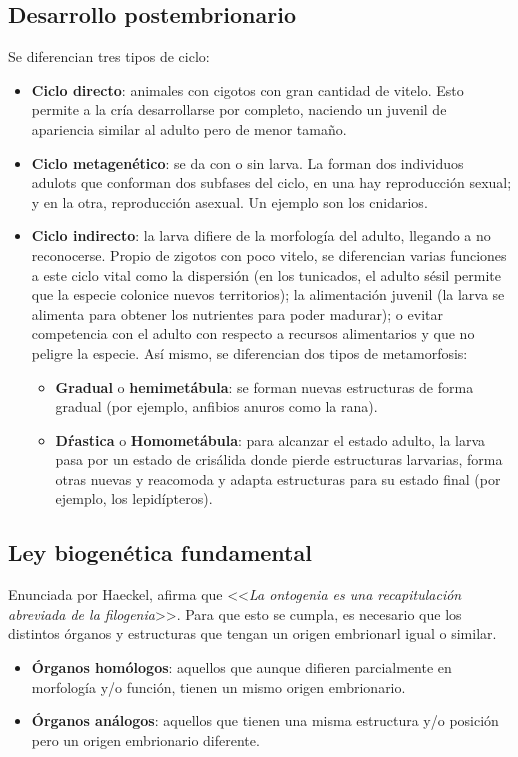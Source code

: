 \subsection{Desarrollo postembrionario}
Se diferencian tres tipos de ciclo:
\begin{itemize}[itemsep=0pt,parsep=0pt,topsep=0pt,partopsep=0pt]
    \item \textbf{Ciclo directo}: animales con cigotos con gran cantidad de vitelo. Esto permite a la cría desarrollarse por completo, naciendo un juvenil de apariencia similar al adulto pero de menor tamaño.
    \item\textbf{Ciclo metagenético}: se da con o sin larva. La forman dos individuos adulots que conforman dos subfases del ciclo, en una hay reproducción sexual; y en la otra, reproducción asexual. Un ejemplo son los cnidarios.
    \item\textbf{Ciclo indirecto}: la larva difiere de la morfología del adulto, llegando a no reconocerse. Propio de zigotos con poco vitelo, se diferencian varias funciones a este ciclo vital como la dispersión (en los tunicados, el adulto sésil permite que la especie colonice nuevos territorios); la alimentación juvenil (la larva se alimenta para obtener los nutrientes para poder madurar); o evitar competencia con el adulto con respecto a recursos alimentarios y que no peligre la especie. Así mismo, se diferencian dos tipos de metamorfosis:
    \begin{itemize}[itemsep=0pt,parsep=0pt,topsep=0pt,partopsep=0pt]
        \item \textbf{Gradual} o \textbf{hemimetábula}: se forman nuevas estructuras de forma gradual (por ejemplo, anfibios anuros como la rana).
        \item\textbf{Dŕastica} o \textbf{Homometábula}: para alcanzar el estado adulto, la larva pasa por un estado de crisálida donde pierde estructuras larvarias, forma otras nuevas y reacomoda y adapta estructuras para su estado final (por ejemplo, los lepidípteros).
    \end{itemize}
\end{itemize}
\subsection{Ley biogenética fundamental}
Enunciada por Haeckel, afirma que <<\textit{La ontogenia es una recapitulación abreviada de la filogenia}>>. Para que esto se cumpla, es necesario que los distintos órganos y estructuras que tengan un origen embrionarl igual o similar.
\begin{itemize}[itemsep=0pt,parsep=0pt,topsep=0pt,partopsep=0pt]
    \item \textbf{Órganos homólogos}: aquellos que aunque difieren parcialmente en morfología y/o función, tienen un mismo origen embrionario.
    \item\textbf{Órganos análogos}: aquellos que tienen una misma estructura y/o posición pero un origen embrionario diferente.
\end{itemize}
